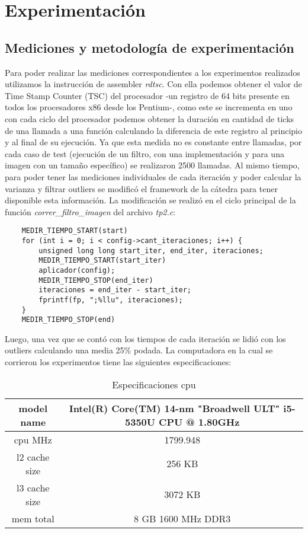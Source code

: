 \section{Experimentación}
\subsection{Mediciones y metodología de experimentación}

Para poder realizar las mediciones correspondientes a los experimentos realizados utilizamos la instrucción de assembler \textit{rdtsc}. Con ella podemos obtener el valor de Time Stamp Counter (TSC) del procesador -un registro de 64 bits presente en todos los procesadores x86 desde los Pentium-, como este se incrementa en uno con cada ciclo del procesador podemos obtener la duración en cantidad de ticks de una llamada a una función calculando la diferencia de este registro al principio y al final de su ejecución. Ya que esta medida no es constante entre llamadas, por cada caso de test (ejecución de un filtro, con una implementación y para una imagen con un tamaño específico) se realizaron 2500 llamadas. Al mismo tiempo, para poder tener las mediciones individuales de cada iteración y poder calcular la varianza y filtrar outliers se modificó el framework de la cátedra para tener disponible esta información.
La modificación se realizó en el ciclo principal de la función \textit{correr_filtro_imagen} del archivo \textit{tp2.c}:

\begin{codesnippet}
  \begin{verbatim}
    MEDIR_TIEMPO_START(start)
    for (int i = 0; i < config->cant_iteraciones; i++) {
        unsigned long long start_iter, end_iter, iteraciones;
        MEDIR_TIEMPO_START(start_iter)
        aplicador(config);
        MEDIR_TIEMPO_STOP(end_iter)
        iteraciones = end_iter - start_iter;
        fprintf(fp, ";%llu", iteraciones);
    }
    MEDIR_TIEMPO_STOP(end)
  \end{verbatim}
\end{codesnippet}

Luego, una vez que se contó con los tiempos de cada iteración se lidió con los outliers calculando una media 25\% podada. La computadora en la cual se corrieron los experimentos tiene las siguientes especificaciones:

\begin{table}[htb]
  \centering
  \caption{Especificaciones cpu}
  \begin{tabular}{|c|c|}
  \hline
    model name & Intel(R) Core(TM) 14-nm "Broadwell ULT" i5-5350U CPU @ 1.80GHz \\ \hline
    cpu MHz & 1799.948 \\ \hline
    l2 cache size & 256 KB \\ \hline
    l3 cache size & 3072 KB \\ \hline
    mem total & 8 GB 1600 MHz DDR3 \\ \hline
  \hline
  \end{tabular}
  \end{table}

